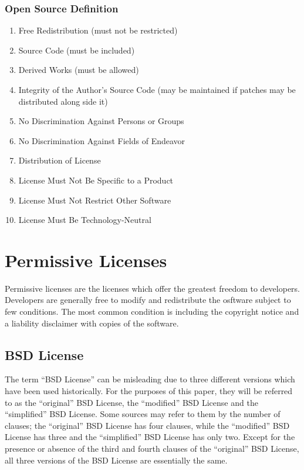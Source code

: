 \documentclass[12pt,letterpaper]{article}
\begin{document}
\subsubsection*{Open Source Definition\cite{opensourcedefinition}}
\begin{enumerate}
\item Free Redistribution (must not be restricted)
\item Source Code (must be included)
\item Derived Works (must be allowed)
\item Integrity of the Author's Source Code (may be maintained if patches may be distributed along side it)
\item No Discrimination Against Persons or Groups
\item No Discrimination Against Fields of Endeavor
\item Distribution of License
\item License Must Not Be Specific to a Product
\item License Must Not Restrict Other Software
\item License Must Be Technology-Neutral
\end{enumerate}

\section{Permissive Licenses}

Permissive licenses are the licenses which offer the greatest freedom to developers. Developers are generally free to modify and redistribute the osftware subject to few conditions. The most common condition is including the copyright notice and a liability disclaimer with copies of the software.\cite{permissive}

\subsection{BSD License}

The term ``BSD License'' can be misleading due to three different versions which have been used historically.\cite{netbsd} For the purposes of this paper, they will be referred to as the ``original'' BSD License, the ``modified'' BSD License and the ``simplified'' BSD License. Some sources may refer to them by the number of clauses; the ``original'' BSD License has four clauses, while the ``modified'' BSD License has three and the ``simplified'' BSD License has only two. Except for the presence or absence of the third and fourth clauses of the ``original'' BSD License, all three versions of the BSD License are essentially the same.
\end{document}
